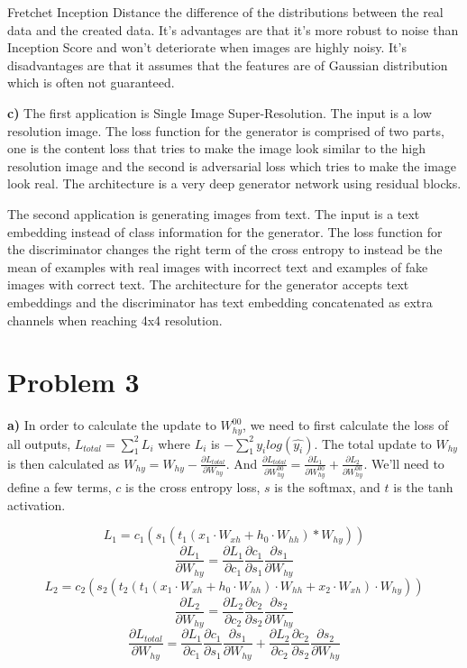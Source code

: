 \documentclass[12pt]{article}
\begin{document}
Fretchet Inception Distance the difference of the distributions between the real data and the created data.
It's advantages are that it's more robust to noise than Inception Score and won't deteriorate when images are highly noisy.
It's disadvantages are that it assumes that the features are of Gaussian distribution which is often not guaranteed.

\textbf{c)} The first application is Single Image Super-Resolution.
The input is a low resolution image.
The loss function for the generator is comprised of two parts, one is the content loss that tries to make the image look similar to the high resolution image and the second is adversarial loss which tries to make the image look real.
The architecture is a very deep generator network using residual blocks.

The second application is generating images from text.
The input is a text embedding instead of class information for the generator.
The loss function for the discriminator changes the right term of the cross entropy to instead be the mean of examples with real images with incorrect text and examples of fake images with correct text.
The architecture for the generator accepts text embeddings and the discriminator has text embedding concatenated as extra channels when reaching 4x4 resolution.

\section{Problem 3}

\textbf{a)} In order to calculate the update to $W_{hy}^{00}$, we need to first calculate the loss of all outputs, $L_{total} = \sum_1^2 L_i$ where $L_i$ is $-\sum_1^2 y_i log(\hat{y_i})$.
The total update to $W_{hy}$ is then calculated as $W_{hy} = W_{hy} - \frac{\partial L_{total}}{\partial W_{hy}}$.
And $\frac{\partial L_{total}}{\partial W_{hy}^{00}} = \frac{\partial L_1}{\partial W_{hy}^{00}} + \frac{\partial L_2}{\partial W_{hy}^{00}}$.
We'll need to define a few terms, $c$ is the cross entropy loss, $s$ is the softmax, and $t$ is the tanh activation.

$$L_1 = c_1(s_1(t_1(x_1 \cdot W_{xh} + h_0 \cdot W_{hh}) * W_{hy}))$$
$$\frac{\partial L_1}{\partial W_{hy}} = \frac{\partial L_1}{\partial c_1}\frac{\partial c_1}{\partial s_1}\frac{\partial s_1}{\partial W_{hy}}$$
$$L_2 = c_2(s_2(t_2(t_1(x_1 \cdot W_{xh} + h_0 \cdot W_{hh}) \cdot W_{hh} + x_2 \cdot W_{xh}) \cdot W_{hy}))$$
$$\frac{\partial L_2}{\partial W_{hy}} = \frac{\partial L_2}{\partial c_2}\frac{\partial c_2}{\partial s_2}\frac{\partial s_2}{\partial W_{hy}}$$
$$\frac{\partial L_{total}}{\partial W_{hy}} = \frac{\partial L_1}{\partial c_1}\frac{\partial c_1}{\partial s_1}\frac{\partial s_1}{\partial W_{hy}} + \frac{\partial L_2}{\partial c_2}\frac{\partial c_2}{\partial s_2}\frac{\partial s_2}{\partial W_{hy}}$$
\end{document}
